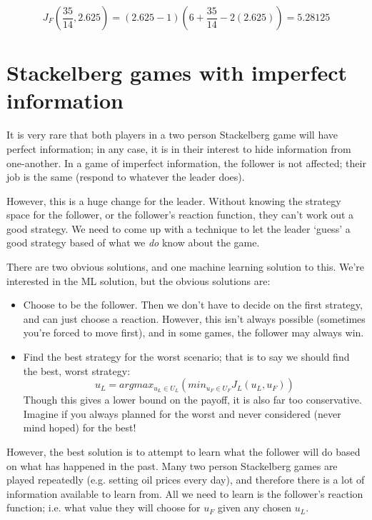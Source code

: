 \[
  J_F(\frac{35}{14}, 2.625) = (2.625 - 1)(6 + \frac{35}{14} - 2(2.625)) = 5.28125
\]


\section{Stackelberg games with imperfect information}

It is very rare that both players in a two person Stackelberg game will have
perfect information; in any case, it is in their interest to hide information
from one-another. In a game of imperfect information, the follower is not
affected; their job is the same (respond to whatever the leader does).

However, this is a huge change for the leader. Without knowing the strategy
space for the follower, or the follower's reaction function, they can't work out
a good strategy. We need to come up with a technique to let the leader `guess' a
good strategy based of what we \textit{do} know about the game.

There are two obvious solutions, and one machine learning solution to this.
We're interested in the ML solution, but the obvious solutions are:

\begin{itemize}
  \item Choose to be the follower. Then we don't have to decide on the first
  strategy, and can just choose a reaction. However, this isn't always possible
  (sometimes you're forced to move first), and in some games, the follower may
  always win.
  \item Find the best strategy for the worst scenario; that is to say we should
  find the best, worst strategy:
  \[
    u_L = arg max_{u_L \in U_L}(min_{u_F \in U_F}J_L(u_L, u_F))
  \]
  Though this gives a lower bound on the payoff, it is also far too
  conservative. Imagine if you always planned for the worst and never considered
  (never mind hoped) for the best!
\end{itemize}

However, the best solution is to attempt to learn what the follower will do
based on what has happened in the past. Many two person Stackelberg games are
played repeatedly (e.g. setting oil prices every day), and therefore there is a
lot of information available to learn from. All we need to learn is the
follower's reaction function; i.e. what value they will choose for $u_F$ given
any chosen $u_L$.

